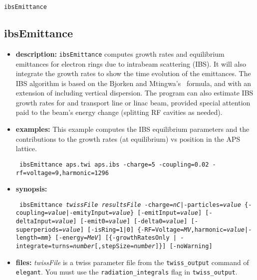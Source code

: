 \documentclass[11pt]{article}
\begin{document}
\newpage
\begin{center}{\Large\verb|ibsEmittance|}\end{center}
\subsection{ibsEmittance}

\begin{itemize}
\item {\bf description:} \verb|ibsEmittance| computes growth rates and
equilibrium emittances for electron rings due to intrabeam scattering
(IBS).  It will also integrate the growth rates to show the time
evolution of the emittances.  The IBS algorithm is based on the
Bjorken and Mtingwa's~\cite{BM} formula, and with an extension of including vertical
dispersion. The program can also estimate IBS growth rates
for and transport line or linac beam, provided special attention paid to the beam's energy
change (splitting RF cavities as needed). 

\item {\bf examples:}
This example computes the IBS equilibrium parameters and the contributions to the
growth rates (at equilibrium) vs position in the APS lattice.
\begin{flushleft}{\tt 
ibsEmittance aps.twi aps.ibs -charge=5 -coupling=0.02 -rf=voltage=9,harmonic=1296
}\end{flushleft}

\item {\bf synopsis:}
\begin{flushleft}{\tt 
ibsEmittance {\em twissFile} {\em resultsFile}
 {-charge={\em nC}|-particles={\em value} }\{-coupling={\em value}|-emityInput={\em value}\}
 [-emitInput={\em value}] [-deltaInput={\em value}]
 [-emit0={\em value}] [-delta0={\em value}]
 [-superperiods={\em value}] [-isRing=1|0]
 \{-RF=Voltage={\em MV},harmonic={\em value}|-length={\em mm}\}
 [-energy={\em MeV}] 
 [\{-growthRatesOnly | -integrate=turns={\em number}[,stepSize={\em number}]\}]
 [-noWarning] 
}\end{flushleft}

\item {\bf files:}
{\em twissFile} is a twiss parameter file from the \verb|twiss_output| command of
{\tt elegant}.    You must use the \verb|radiation_integrals| flag in \verb|twiss_output|.


\end{itemize}
\end{document}
